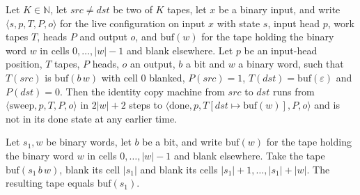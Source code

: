 \begin{theorem}
\label{Turing.NTimeDiag.dz_tail_run}
\leanok
{}
Let $K \in \mathbb{N}$, let $\mathit{src} \ne \mathit{dst}$ be two of $K$ tapes, let $x$ be a binary input, and write $\langle s, p, T, P, o\rangle$ for the live configuration on input $x$ with state $s$, input head $p$, work tapes $T$, heads $P$ and output $o$, and $\mathrm{buf}(w)$ for the tape holding the binary word $w$ in cells $0, \dots, |w| - 1$ and blank elsewhere. Let $p$ be an input-head position, $T$ tapes, $P$ heads, $o$ an output, $b$ a bit and $w$ a binary word, such that $T(\mathit{src})$ is $\mathrm{buf}(b\,w)$ with cell $0$ blanked, $P(\mathit{src}) = 1$, $T(\mathit{dst}) = \mathrm{buf}(\varepsilon)$ and $P(\mathit{dst}) = 0$. Then the identity copy machine from $\mathit{src}$ to $\mathit{dst}$ runs from $\langle \text{sweep}, p, T, P, o\rangle$ in $2|w| + 2$ steps to $\langle \text{done}, p, T[\mathit{dst} \mapsto \mathrm{buf}(w)], P, o\rangle$ and is not in its done state at any earlier time.
\end{theorem}

\begin{theorem}
\label{Turing.NTimeDiag.dz_split_tape}
\leanok
{}
Let $s_1, w$ be binary words, let $b$ be a bit, and write $\mathrm{buf}(w)$ for the tape holding the binary word $w$ in cells $0, \dots, |w| - 1$ and blank elsewhere. Take the tape $\mathrm{buf}(s_1\,b\,w)$, blank its cell $|s_1|$ and blank its cells $|s_1| + 1, \dots, |s_1| + |w|$. The resulting tape equals $\mathrm{buf}(s_1)$.
\end{theorem}

